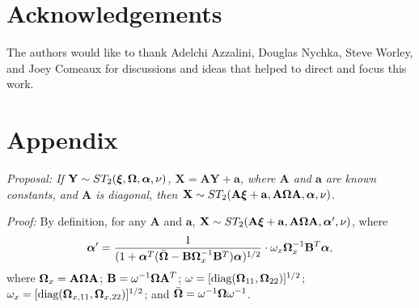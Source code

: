 \documentclass[12pt]{article}
\def\diag{\hbox{diag}}
\def\diag{\hbox{diag}}
\def\balpha{{\boldsymbol \alpha}}
\def\balpha{{\boldsymbol \alpha}}
\def\bxi{{\boldsymbol \xi}}
\def\ni{\noindent}
\def\bOmega{{\ensuremath\boldsymbol{\Omega}}}
\def\bOmega{{\ensuremath\boldsymbol{\Omega}}}
\begin{document}
\section*{Acknowledgements}
The authors would like to thank Adelchi Azzalini, Douglas Nychka, Steve Worley, and Joey Comeaux for  discussions and ideas that helped to direct and focus this work.  

\section*{Appendix}
\ni \emph{Proposal:  If $\mathbf{Y}\sim ST_2(\bxi,\bOmega,\balpha,\nu)$,  $\mathbf{X}=\mathbf{A}\mathbf{Y}+\mathbf{a}$, where $\mathbf{A}$ and $\mathbf{a}$ are known constants, and $\mathbf{A}$ is diagonal, then  $\mathbf{X}\sim ST_2(\mathbf{A}\bxi+\mathbf{a}, \mathbf{A}\bOmega\mathbf{A}, \balpha,\nu)$.  }

\vspace{.5cm}
\ni \emph{Proof:}  By definition, for any $\mathbf{A}$ and $\mathbf{a}$, $\mathbf{X}\sim ST_2(\mathbf{A}\bxi+\mathbf{a}, \mathbf{A}\bOmega\mathbf{A}, \balpha',\nu)$, where 
\begin{equation}\label{eq:alpha}\balpha'= \frac{1}{(1+\balpha^T(\bar\bOmega-\mathbf{B}\bOmega_x^{-1}\mathbf{B}^T)\balpha)^{1/2}}\cdot \omega_x \bOmega_x^{-1}\mathbf{B}^T\balpha,\end{equation}
 where $\bOmega_x = \mathbf{A}\bOmega\mathbf{A}$; 
 $\mathbf{B} = \omega^{-1}\bOmega\mathbf{A}^T$; 
  $\omega = [\diag(\bOmega_{11}, \bOmega_{22})]^{1/2}$; 
 $\omega_x = [\diag(\bOmega_{x,11}, \bOmega_{x,22})]^{1/2}$; and 
 $\bar\bOmega = \omega^{-1}\bOmega\omega^{-1}$.
\end{document}
